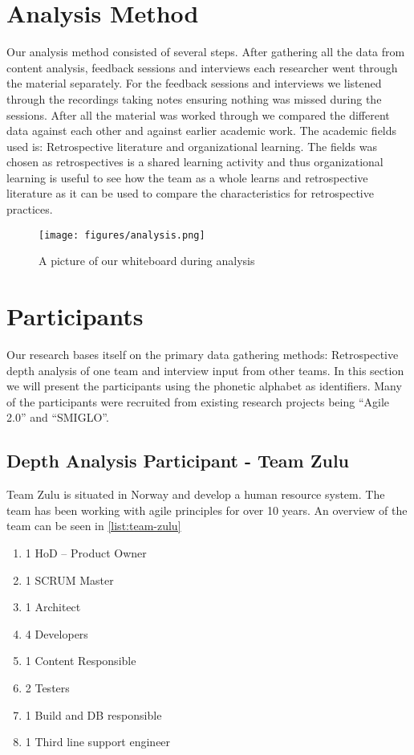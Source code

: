 \section{Analysis Method}
Our analysis method consisted of several steps. After gathering all the data from content analysis, feedback sessions and interviews each researcher went through the material separately. For the feedback sessions and interviews we listened through the recordings taking notes ensuring nothing was missed during the sessions. After all the material was worked through we compared the different data against each other and against earlier academic work. The academic fields used is: Retrospective literature and organizational learning. The fields was chosen as retrospectives is a shared learning activity and thus organizational learning is useful to see how the team as a whole learns and retrospective literature  as it can be used to compare the characteristics for retrospective practices.

\begin{figure}[!h]
	\centering
	\texttt{[image: figures/analysis.png]}
	\caption{A picture of our whiteboard during analysis}
	\label{fig:Analysis-trends}
\end{figure}

\clearpage

\section{Participants}
Our research bases itself on the primary data gathering methods: Retrospective depth analysis of one team and interview input from other teams. In this section we will present the participants using the phonetic alphabet as identifiers. Many of the participants were recruited from existing research projects being ``Agile 2.0'' and ``SMIGLO''.

\subsection{Depth Analysis Participant - Team Zulu}
\label{section:team-zulu-description}
Team Zulu is situated in Norway and develop a human resource system. The team has been working with agile principles for over 10 years. An overview of the team can be seen in \autoref{list:team-zulu}

 \begin{enumerate}
 \label{list:team-zulu}
	\item 1 HoD – Product Owner 
	\item 1 SCRUM Master
	\item 1 Architect
	\item 4 Developers
	\item 1 Content Responsible
	\item 2 Testers
	\item 1 Build and DB responsible
	\item 1 Third line support engineer
\end{enumerate} 

